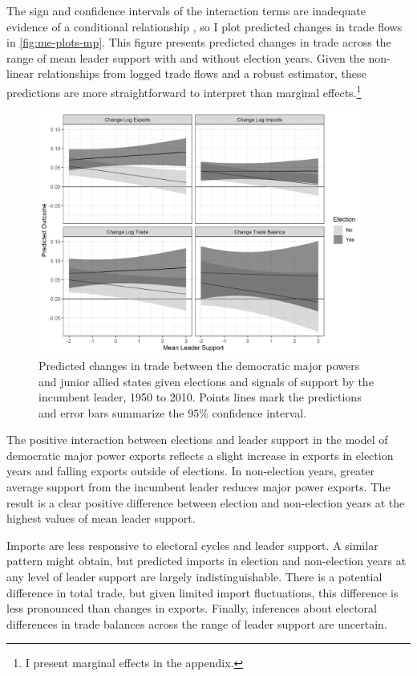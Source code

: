 \documentclass[12pt]{article}
\begin{document}
The sign and confidence intervals of the interaction terms are inadequate evidence of a conditional relationship \citep{BramborClarkGolder2006}, so I plot predicted changes in trade flows in \autoref{fig:me-plots-mp}.
This figure presents predicted changes in trade across the range of mean leader support with and without election years. 
Given the non-linear relationships from logged trade flows and a robust estimator, these predictions are more straightforward to interpret than marginal effects.\footnote{I present marginal effects in the appendix.} 


\begin{figure}[htpb]
	\centering
		\includegraphics[width=0.95\textwidth]{../figures/pred-mp-trade.png}
	\caption{Predicted changes in trade between the democratic major powers and junior allied states given elections and signals of support by the incumbent leader, 1950 to 2010. Points lines mark the predictions and error bars summarize the 95\% confidence interval.}
	\label{fig:me-plots-mp}
\end{figure}


The positive interaction between elections and leader support in the model of democratic major power exports reflects a slight increase in exports in election years and falling exports outside of elections. 
In non-election years, greater average support from the incumbent leader reduces major power exports. 
The result is a clear positive difference between election and non-election years at the highest values of mean leader support. 


Imports are less responsive to electoral cycles and leader support. 
A similar pattern might obtain, but predicted imports in election and non-election years at any level of leader support are largely indistinguishable. 
There is a potential difference in total trade, but given limited import fluctuations, this difference is less pronounced than changes in exports. 
Finally, inferences about electoral differences in trade balances across the range of leader support are uncertain.
\end{document}
